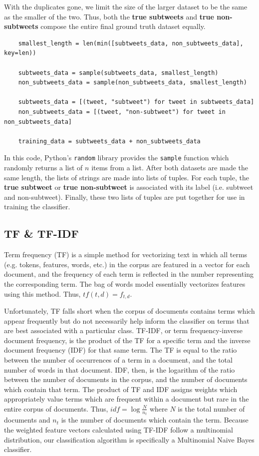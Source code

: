 \documentclass[11pt, twoside, reqno]{book}
\begin{document}
\noindent
With the duplicates gone, we limit the size of the larger dataset to be the same as the smaller of the two. Thus, both the \textbf{true subtweets} and \textbf{true non-subtweets} compose the entire final ground truth dataset equally.

\begin{verbatim}
	smallest_length = len(min([subtweets_data, non_subtweets_data], key=len))

	subtweets_data = sample(subtweets_data, smallest_length)
	non_subtweets_data = sample(non_subtweets_data, smallest_length)

	subtweets_data = [(tweet, "subtweet") for tweet in subtweets_data]
	non_subtweets_data = [(tweet, "non-subtweet") for tweet in non_subtweets_data]

	training_data = subtweets_data + non_subtweets_data
\end{verbatim}

\noindent
In this code, Python's \verb|random| library provides the \verb|sample| function which randomly returns a list of $n$ items from a list. After both datasets are made the same length, the lists of strings are made into lists of tuples. For each tuple, the \textbf{true subtweet} or \textbf{true non-subtweet} is associated with its label (i.e. subtweet and non-subtweet). Finally, these two lists of tuples are put together for use in training the classifier.

\subsection{TF \& TF-IDF}
\label{tf_tf_idf}

Term frequency (TF) is a simple method for vectorizing text in which all terms (e.g. tokens, features, words, etc.) in the corpus are featured in a vector for each document, and the frequency of each term is reflected in the number representing the corresponding term. The bag of words model essentially vectorizes features using this method. Thus, $tf(t,d)=f_{t,d}$.

Unfortunately, TF falls short when the corpus of documents contains terms which appear frequently but do not necessarily help inform the classifier on terms that are best associated with a particular class. TF-IDF, or term frequency-inverse document frequency, is the product of the TF for a specific term and the inverse document frequency (IDF) for that same term. The TF is equal to the ratio between the number of occurrences of a term in a document, and the total number of words in that document. IDF, then, is the logarithm of the ratio between the number of documents in the corpus, and the number of documents which contain that term. The product of TF and IDF assigns weights which appropriately value terms which are frequent within a document but rare in the entire corpus of documents. Thus, $idf=\log\frac{N}{n_{t}}$ where $N$ is the total number of documents and $n_{t}$ is the number of documents which contain the term. Because the weighted feature vectors calculated using TF-IDF follow a multinomial distribution, our classification algorithm is specifically a Multinomial Naive Bayes classifier.
\end{document}
